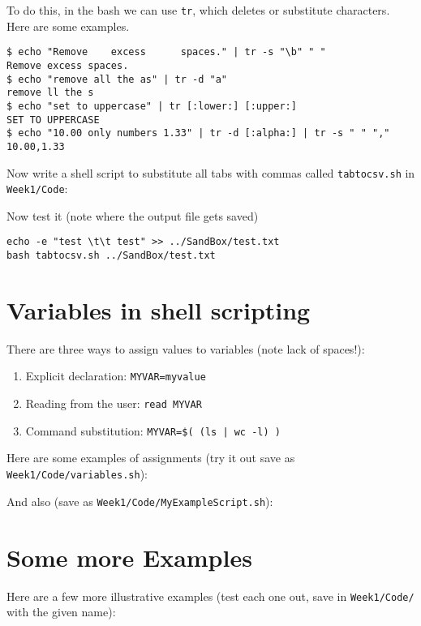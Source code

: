 To do this, in the bash we can use {\tt tr}, which deletes or 
substitute characters. Here are some examples.
\begin{lstlisting}
$ echo "Remove    excess      spaces." | tr -s "\b" " "
Remove excess spaces.
$ echo "remove all the as" | tr -d "a"
remove ll the s
$ echo "set to uppercase" | tr [:lower:] [:upper:]
SET TO UPPERCASE
$ echo "10.00 only numbers 1.33" | tr -d [:alpha:] | tr -s " " ","
10.00,1.33

\end{lstlisting}
 
Now write a shell script to substitute all tabs with commas called
{\tt tabtocsv.sh} in {\tt Week1/Code}:


 
Now test it (note where the output file gets saved)
\begin{lstlisting}
echo -e "test \t\t test" >> ../SandBox/test.txt
bash tabtocsv.sh ../SandBox/test.txt
\end{lstlisting}

\section{Variables in shell scripting}

There are three ways to assign values to variables (note lack of
spaces!):
  \begin{enumerate}
    \item Explicit declaration: {\tt MYVAR=myvalue}
    \item Reading from the user: {\tt read MYVAR}
    \item Command substitution: {\tt MYVAR=\$( (ls | wc -l) )}
\end{enumerate}

Here are some examples of assignments (try it out save as {\tt 
Week1/Code/variables.sh}):

{\tiny }

And also (save as {\tt Week1/Code/MyExampleScript.sh}): 



\section{Some more Examples}

Here are a few more illustrative examples (test each one out, save in
{\tt Week1/Code/} with the given name):

